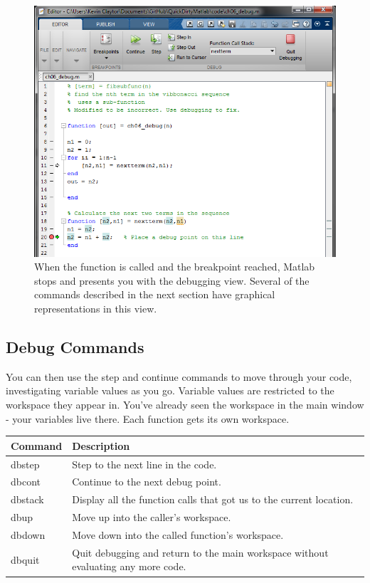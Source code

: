 \pagebreak
\begin{figure}[ht!]
\centering
\includegraphics[width=120mm]{img/debug2.png}
\caption{When the function is called and the breakpoint reached, Matlab stops and presents you with the debugging view. Several of the commands described in the next section have graphical representations in this view.}
\label{guiload}
\end{figure}

\pagebreak
\subsection{Debug Commands}
\label{subsec:debugfile}
You can then use the step and continue commands to move through your code, investigating variable values as you go.
 Variable values are restricted to the workspace they appear in.
 You've already seen the workspace in the main window - your variables live there.
 Each function gets its own workspace.

\begin{center}
    \begin{tabular}{ | l | p{7cm} |}
    \hline Command & Description \\ \hline
    dbstep & Step to the next line in the code. \\ \hline
    dbcont & Continue to the next debug point. \\ \hline
    dbstack & Display all the function calls that got us to the current location. \\ \hline
    dbup & Move up into the caller's workspace. \\ \hline
    dbdown & Move down into the called function's workspace. \\ \hline
    dbquit & Quit debugging and return to the main workspace without evaluating any more code. \\ \hline
    \end{tabular}
\end{center}

